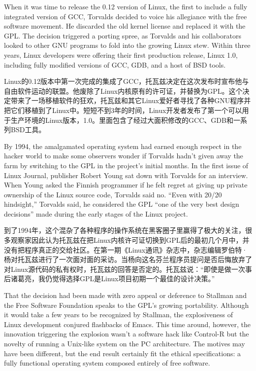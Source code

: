 \ifdefined\eng
When it was time to release the 0.12 version of Linux, the first to include a fully integrated version of GCC, Torvalds decided to voice his allegiance with the free software movement. He discarded the old kernel license and replaced it with the GPL. The decision triggered a porting spree, as Torvalds and his collaborators looked to other GNU programs to fold into the growing Linux stew. Within three years, Linux developers were offering their first production release, Linux 1.0, including fully modified versions of GCC, GDB, and a host of BSD tools.
\fi

\ifdefined\chs
Linux的0.12版本中第一次完成的集成了GCC，托瓦兹决定在这次发布时宣布他与自由软件运动的联盟。他废除了Linux内核原有的许可证，并替换为GPL。这个决定带来了一场移植软件的狂欢，托瓦兹和其它Linux爱好者寻找了各种GNU程序并把它们移植到了Linux中。短短不到3年的时间，Linux开发者发布了第一个可以用于生产环境的Linux版本，1.0。里面包含了经过大面积修改的GCC、GDB和一系列BSD工具。
\fi


\ifdefined\eng
By 1994, the amalgamated operating system had earned enough respect in the hacker world to make some observers wonder if Torvalds hadn't given away the farm by switching to the GPL in the project's initial months. In the first issue of Linux Journal, publisher Robert Young sat down with Torvalds for an interview. When Young asked the Finnish programmer if he felt regret at giving up private ownership of the Linux source code, Torvalds said no. ``Even with 20/20 hindsight,'' Torvalds said, he considered the GPL ``one of the very best design decisions'' made during the early stages of the Linux project.
\fi

\ifdefined\chs
到了1994年，这个混杂了各种程序的操作系统在黑客圈子里赢得了极大的关注，很多观察家因此认为托瓦兹在把Linux内核许可证切换到GPL后的最初几个月中，并没有把程序真正的交给社区。在第一期《Linux通讯》杂志中，杂志编辑罗伯特·杨对托瓦兹进行了一次面对面的采访。当杨向这名芬兰程序员提问是否后悔放弃了对Linux源代码的私有权时，托瓦兹的回答是否定的。托瓦兹说：``即使是做一次事后诸葛亮，我仍觉得选择GPL是Linux项目初期一个最佳的设计决策。''
\fi

\ifdefined\eng
That the decision had been made with zero appeal or deference to Stallman and the Free Software Foundation speaks to the GPL's growing portability. Although it would take a few years to be recognized by Stallman, the explosiveness of Linux development conjured flashbacks of Emacs. This time around, however, the innovation triggering the explosion wasn't a software hack like Control-R but the novelty of running a Unix-like system on the PC architecture. The motives may have been different, but the end result certainly fit the ethical specifications: a fully functional operating system composed entirely of free software.
\fi

